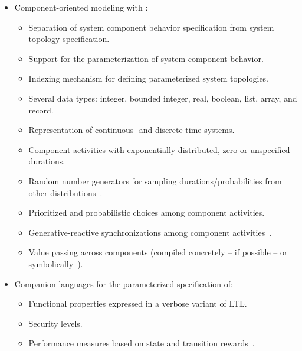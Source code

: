 	\begin{itemize}

\item Component-oriented modeling with \aemilia:

		\begin{itemize}

\item Separation of system component behavior specification from system topology specification.

\item Support for the parameterization of system component behavior.

\item Indexing mechanism for defining parameterized system topologies.

\item Several data types: integer, bounded integer, real, boolean, list, array, and record.

\item Representation of continuous- and discrete-time systems.

\item Component activities with exponentially distributed, zero or unspecified durations.

\item Random number generators for sampling durations/probabilities from other distributions~\cite{Jai}.

\item Prioritized and probabilistic choices among component activities.

\item Generative-reactive synchronizations among component activities~\cite{BB2}.

\item Value passing across components (compiled concretely -- if possible -- or symbolically~\cite{Ber2}).

		\end{itemize}

\item Companion languages for the parameterized specification of:

		\begin{itemize}

\item Functional properties expressed in a verbose variant of LTL.

\item Security levels.

\item Performance measures based on state and transition rewards~\cite{BB1}.


\end{itemize}
\end{itemize}
